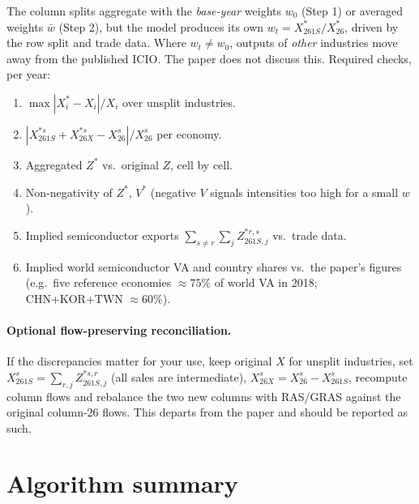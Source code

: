 \documentclass[11pt,a4paper]{article}
\theoremstyle{remark}
\theoremstyle{definition}
\newcommand{\sem}{{261S}}   %
\newcommand{\oth}{{26X}}    %
\newcommand{\agg}{{26}}     %
\begin{document}
The column splits aggregate with the \emph{base-year} weights $w_0$ (Step 1) or averaged weights $\bar w$
(Step 2), but the model produces its own $w_t = X^\ast_\sem/X^\ast_\agg$, driven by the row split and trade data.
Where $w_t\neq w_0$, outputs of \emph{other} industries move away from the published ICIO. The paper does not
discuss this. Required checks, per year:
\begin{enumerate}[nosep]
  \item $\max |X^\ast_i - X_i|/X_i$ over unsplit industries.
  \item $|X^{\ast s}_\sem + X^{\ast s}_\oth - X^s_\agg| / X^s_\agg$ per economy.
  \item Aggregated $Z^\ast$ vs.\ original $Z$, cell by cell.
  \item Non-negativity of $Z^\ast$, $V^\ast$ (negative $V$ signals intensities too high for a small $w$).
  \item Implied semiconductor exports $\sum_{s\neq r}\sum_j Z^{\ast r,s}_{\sem,j}$ vs.\ trade data.
  \item Implied world semiconductor VA and country shares vs.\ the paper's figures (e.g.\ five reference
        economies $\approx 75\%$ of world VA in 2018; CHN+KOR+TWN $\approx 60\%$).
\end{enumerate}

\paragraph{Optional flow-preserving reconciliation.} If the discrepancies matter for your use, keep original
$X$ for unsplit industries, set $X^s_\sem = \sum_{r,j}Z^{\ast s,r}_{\sem,j}$ (all sales are intermediate),
$X^s_\oth = X^s_\agg - X^s_\sem$, recompute column flows and rebalance the two new columns with RAS/GRAS against
the original column-26 flows. This departs from the paper and should be reported as such.

\section{Algorithm summary}
\end{document}
